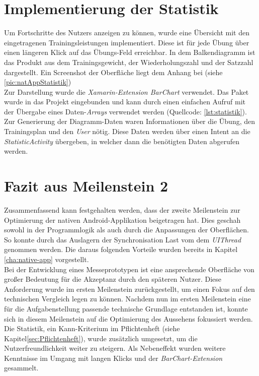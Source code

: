 \section{Implementierung der Statistik}
\label{sec:implementierung-statistik}
Um Fortschritte des Nutzers anzeigen zu können, wurde eine Übersicht mit den eingetragenen Trainingsleistungen implementiert. Diese ist für jede Übung über einen längeren Klick auf das Übungs-Feld erreichbar. In dem Balkendiagramm ist das Produkt aus dem Trainingsgewicht, der Wiederholungszahl und der Satzzahl dargestellt. Ein Screenshot der Oberfläche liegt dem Anhang bei (siehe \ref{pic:natAppStatistik})\\
Zur Darstellung wurde die \textit{Xamarin-Extension BarChart} verwendet. Das Paket  wurde in das Projekt eingebunden und kann durch einen einfachen Aufruf mit der Übergabe eines Daten-\textit{Arrays} verwendet werden (Quellcode: \ref{lst:statistik}).\\
Zur Generierung der Diagramm-Daten waren Informationen über die Übung, den Trainingsplan und den \textit{User} nötig. Diese Daten werden über einen Intent an die \textit{StatisticActivity} übergeben, in welcher dann die benötigten Daten abgerufen werden.


\section{Fazit aus Meilenstein 2}
\label{sec:fazit-meilenstein-2}
Zusammenfassend kann festgehalten werden, dass der zweite Meilenstein zur Optimierung der nativen Android-Applikation beigetragen hat. Dies geschah sowohl in der Programmlogik als auch durch die Anpassungen der Oberflächen. \\
So konnte durch das Auslagern der Synchronisation Last vom dem \textit{UIThread} genommen werden. Die daraus folgenden Vorteile wurden bereits in Kapitel \ref{cha:native-app} vorgestellt.\\
Bei der Entwicklung eines Messeprototypen ist eine ansprechende Oberfläche von großer Bedeutung für die Akzeptanz durch den späteren Nutzer. Diese Anforderung wurde im ersten Meilenstein zurückgestellt, um einen Fokus auf den technischen Vergleich legen zu können. Nachdem nun im ersten Meilenstein eine für die Aufgabenstellung passende technische Grundlage entstanden ist, konnte sich in diesem Meilenstein auf die Optimierung des Aussehens fokussiert werden.\\
Die Statistik, ein Kann-Kriterium im Pflichtenheft (siehe Kapitel\ref{sec:Pflichtenheft}), wurde zusätzlich umgesetzt, um die Nutzerfreundlichkeit weiter zu steigern. Als Nebeneffekt wurden weitere Kenntnisse im Umgang mit langen Klicks und der \textit{BarChart-Extension} gesammelt.\\

